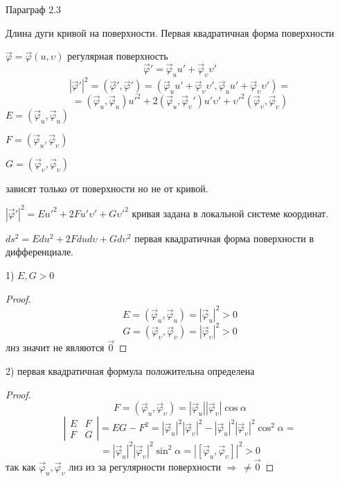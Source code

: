 \begin{title}[\Large]
  Параграф 2.3
\end{title}

\begin{title}[\Large]
  Длина дуги кривой на поверхности. Первая квадратичная форма поверхности
\end{title}

\begin{define}
  $\vec \varphi = \vec \varphi(u, \upsilon)$ регулярная поверхность
  $$
  \vec \varphi' = \vec \varphi_u u' + \vec \varphi_{\upsilon} \upsilon'
  $$
  $$
  |\vec \varphi'|^2 = (\vec \varphi', \vec \varphi') =
  (\vec \varphi_u u' + \vec \varphi_{\upsilon} \upsilon',
  \vec \varphi_u u' + \vec \varphi_{\upsilon} \upsilon') =
  $$
  $$
  = (\vec \varphi_u, \vec \varphi_u)u'^2 + 2(\vec \varphi_u,
  \vec \varphi_{\upsilon}') u' \upsilon' + \upsilon'^2 (\vec \varphi_{\upsilon},
  \vec \varphi_{\upsilon})
  $$
  $E = (\vec \varphi_u, \vec \varphi_u)$

  $F = (\vec \varphi_u, \vec \varphi_{\upsilon})$

  $G = (\vec \varphi_{\upsilon}, \vec \varphi_{\upsilon})$

  зависят только от поверхности но не от кривой.

  $|\vec \varphi'|^2 = E u'^2 + 2Fu'\upsilon' + G\upsilon'^2$ кривая задана в
  локальной системе координат.

  $ds^2 = Edu^2 + 2Fdud\upsilon + Gd\upsilon^2$ первая квадратичная форма
  поверхности в дифференциале.
\end{define}

\begin{block}[Свойства]
  1) $E,G > 0$

  \begin{proof}
    $$
    E = (\vec \varphi_u, \vec \varphi_u) = |\vec \varphi_u|^2 > 0
    $$
    $$
    G = (\vec \varphi_{\upsilon}, \vec \varphi_{\upsilon}) =
    |\vec \varphi_{\upsilon}|^2 > 0
    $$
    лнз значит не являются $\vec 0$
  \end{proof}

  2) первая квадратичная формула положительна определена

  \begin{proof}
    $$
    F = (\vec \varphi_u, \vec \varphi_{\upsilon}) = |\vec \varphi_u|
    |\vec \varphi_{\upsilon}| \cos \alpha
    $$
    $$
    \left|
    \begin{array}{cc}
      E & F \\
      F & G
    \end{array}
    \right|
    = EG - F^2 = |\vec \varphi_u|^2|\vec \varphi_{\upsilon}|^2 -
    |\vec \varphi_u|^2 |\vec \varphi_{\upsilon}|^2 \cos^2 \alpha =
    $$
    $$
    = |\vec \varphi_u|^2
    |\vec \varphi_{\upsilon}|^2 \sin^2 \alpha = |[\vec \varphi_u, \vec
    \varphi_{\upsilon}]|^2 > 0
    $$
    так как $\vec \varphi_u, \vec \varphi_{\upsilon}$ лнз из за регулярности
    поверхности $\Rightarrow ~ \not= \vec 0$
  \end{proof}
\end{block}

